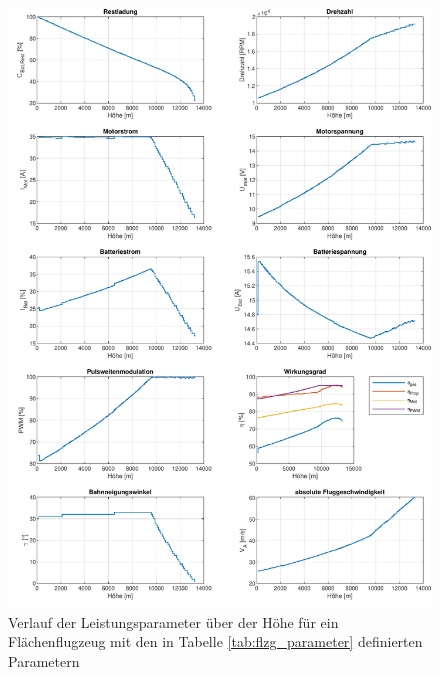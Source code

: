 \begin{figure}[H]
	\includegraphics[scale=0.7]{Diagramme/Ausgangskonstellation.pdf}
	\caption{Verlauf der Leistungsparameter über der Höhe für ein Flächenflugzeug mit den in Tabelle \ref{tab:flzg_parameter} definierten Parametern}
	\label{abb:ausgangskonstellation}
\end{figure}

